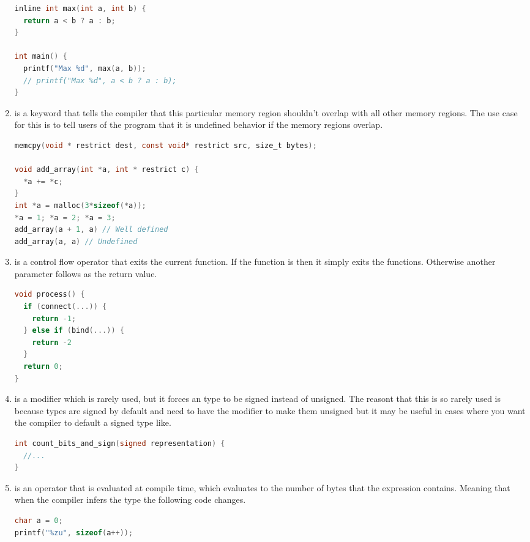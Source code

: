 \begin{enumerate}
	      \begin{lstlisting}[language=C]
inline int max(int a, int b) {
  return a < b ? a : b;
}

int main() {
  printf("Max %d", max(a, b));
  // printf("Max %d", a < b ? a : b);
}
\end{lstlisting}

	\item {} is a keyword that tells the compiler that this particular memory region shouldn't overlap with all other memory regions. The use case for this is to tell users of the program that it is undefined behavior if the memory regions overlap.

	      \begin{lstlisting}[language=C]
memcpy(void * restrict dest, const void* restrict src, size_t bytes);

void add_array(int *a, int * restrict c) {
  *a += *c;
}
int *a = malloc(3*sizeof(*a));
*a = 1; *a = 2; *a = 3;
add_array(a + 1, a) // Well defined
add_array(a, a) // Undefined
\end{lstlisting}
	\item {} is a control flow operator that exits the current function. If the function is  then it simply exits the functions. Otherwise another parameter follows as the return value.

	      \begin{lstlisting}[language=C]
void process() {
  if (connect(...)) {
    return -1;
  } else if (bind(...)) {
    return -2
  }
  return 0;
}
\end{lstlisting}

	\item {} is a modifier which is rarely used, but it forces an type to be signed instead of unsigned. The reasont that this is so rarely used is because types are signed by default and need to have the  modifier to make them unsigned but it may be useful in cases where you want the compiler to default a signed type like.

	      \begin{lstlisting}[language=C]
int count_bits_and_sign(signed representation) {
  //...
}
\end{lstlisting}
	\item {} is an operator that is evaluated at compile time, which evaluates to the number of bytes that the expression contains. Meaning that when the compiler infers the type the following code changes.
	      \begin{lstlisting}[language=C]
char a = 0;
printf("%zu", sizeof(a++));
\end{lstlisting}


\end{enumerate}
